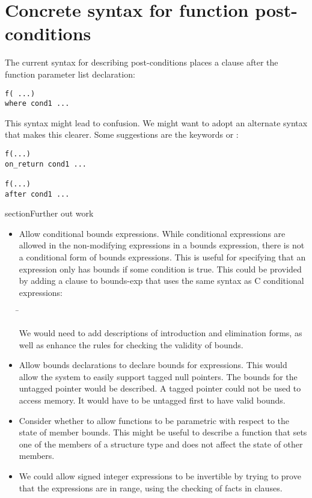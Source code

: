 \section{Concrete syntax for function post-conditions}
 
The current syntax for describing post-conditions places a 
clause after the function parameter list declaration:

\begin{lstlisting}
f( ...)
where cond1 ...
\end{lstlisting}

This syntax might lead to confusion. We might want to adopt an alternate
syntax that makes this clearer. Some suggestions are the keywords
 or :

\begin{lstlisting}
f(...)
on_return cond1 ...

f(...)
after cond1 ...
\end{lstlisting}

section{Further out work}
\begin{itemize}
\item Allow conditional bounds expressions.   While conditional
expressions are allowed in the non-modifying expressions in a bounds expression, 
there is not a conditional form of bounds expressions.  This is useful for
specifying that an expression only has bounds if some condition is true.
This could be provided by adding a clause to bounds-exp that uses the
same syntax as C conditional expressions:
\begin{tabbing}
\= \\
\>   \code{:} 
\end{tabbing}

We would need to add descriptions of introduction and elimination
forms, as well as enhance the rules for checking the validity of bounds.

\item Allow bounds declarations to declare bounds for expressions.
This would allow the system to easily support tagged null pointers.
The bounds for the untagged pointer would be described. 
A tagged pointer could not be used to access memory.  It would have to be
untagged first  to have valid bounds.

\item Consider whether to allow functions to be
parametric with respect to the state of member bounds. This might be
useful to describe a function that sets one of the members of a
structure type and does not affect the state of other members.

\item We could allow signed integer expressions to be invertible
by trying to prove that the expressions are in range, using the
checking of facts in  clauses.
\end{itemize}



